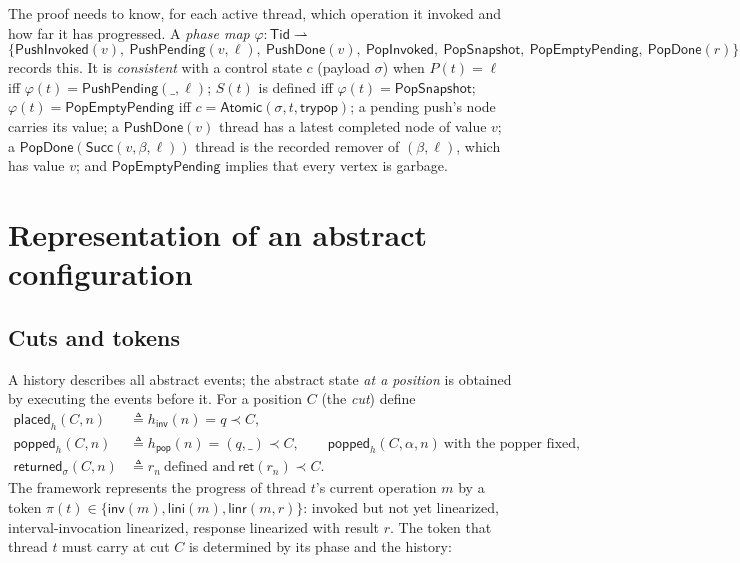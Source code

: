 \documentclass[11pt]{article}
\theoremstyle{definition}
\theoremstyle{remark}
\newcommand{\Tid}{\mathsf{Tid}}
\newcommand{\Atomic}{\mathsf{Atomic}}
\newcommand{\Inv}{\mathsf{inv}}
\newcommand{\Lini}{\mathsf{lini}}
\newcommand{\Linr}{\mathsf{linr}}
\newcommand{\TryPop}{\mathsf{trypop}}
\newcommand{\Succ}{\mathsf{Succ}}
\newcommand{\conc}{\sigma}
\newcommand{\tokens}{\pi}
\newcommand{\Placed}{\mathsf{placed}}
\newcommand{\Popped}{\mathsf{popped}}
\newcommand{\RetBefore}{\mathsf{returned}}
\newcommand{\phase}[1]{\mathsf{#1}}
\newcommand{\lt}{\prec}
\newcommand{\ret}{\mathsf{ret}}
\newcommand{\pop}{\mathsf{pop}}
\newcommand{\inv}{\mathsf{inv}}
\begin{document}
The proof needs to know, for each active thread, which operation it invoked
and how far it has progressed.  A \emph{phase map} \(\varphi:\Tid\rightharpoonup\)
\[
  \{\phase{PushInvoked}(v),\ \phase{PushPending}(v,\ell),\ \phase{PushDone}(v),\
    \phase{PopInvoked},\ \phase{PopSnapshot},\ \phase{PopEmptyPending},\
    \phase{PopDone}(r)\}
\]
records this.  It is \emph{consistent} with a control state \(c\) (payload
\(\conc\)) when \(P(t)=\ell\) iff \(\varphi(t)=\phase{PushPending}(\_,\ell)\);
\(S(t)\) is defined iff \(\varphi(t)=\phase{PopSnapshot}\);
\(\varphi(t)=\phase{PopEmptyPending}\) iff \(c=\Atomic(\conc,t,\TryPop)\);
a pending push's node carries its value; a \(\phase{PushDone}(v)\) thread has a
latest completed node of value \(v\); a \(\phase{PopDone}(\Succ(v,\beta,\ell))\)
thread is the recorded remover of \((\beta,\ell)\), which has value \(v\);
and \(\phase{PopEmptyPending}\) implies that every vertex is garbage.

\section{Representation of an abstract configuration}

\subsection{Cuts and tokens}

A history describes all abstract events; the abstract state \emph{at a
position} is obtained by executing the events before it.  For a position
\(C\) (the \emph{cut}) define
\begin{align*}
  \Placed_h(C,n)&\triangleq h_\inv(n)=q\lt C,\\
  \Popped_h(C,n)&\triangleq h_\pop(n)=(q,\_)\lt C,\qquad
  \Popped_h(C,\alpha,n)\ \text{with the popper fixed},\\
  \RetBefore_\conc(C,n)&\triangleq r_n\ \text{defined and}\ \ret(r_n)\lt C.
\end{align*}
The framework represents the progress of thread \(t\)'s current operation
\(m\) by a token \(\tokens(t)\in\{\Inv(m),\Lini(m),\Linr(m,r)\}\): invoked
but not yet linearized, interval-invocation linearized, response linearized
with result \(r\).  The token that thread \(t\) must carry at cut \(C\) is
determined by its phase and the history:
\end{document}
